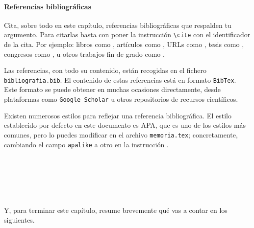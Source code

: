 \paragraph{Referencias bibliográficas}
\label{sec:referencias}

Cita, sobre todo en este capítulo, referencias bibliográficas que respalden tu argumento. Para citarlas basta con poner la instrucción \verb|\cite| con el identificador de la cita. Por ejemplo: libros como \cite{vega12e}, artículos como \cite{vega19b}, URLs como \cite{vega19a}, tesis como \cite{vega18b}, congresos como \cite{vega18a}, u otros trabajos fin de grado como \cite{vega08b}.

Las referencias, con todo su contenido, están recogidas en el fichero \texttt{bibliografia.bib}. El contenido de estas referencias está en formato \texttt{BibTex}. Este formato se puede obtener en muchas ocasiones directamente, desde plataformas como \texttt{Google Scholar} u otros repositorios de recursos científicos.

Existen numerosos estilos para reflejar una referencia bibliográfica. El estilo establecido por defecto en este documento es APA, que es uno de los estilos más comunes, pero lo puedes modificar en el archivo \texttt{memoria.tex}; concretamente, cambiando el campo \verb|apalike| a otro en la instrucción \verb||. 




\

\

\

Y, para terminar este capítulo, resume brevemente qué vas a contar en los siguientes.
